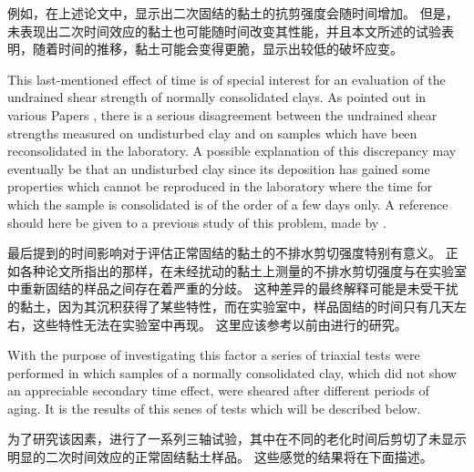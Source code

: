 \begin{paracol}{2}
    \switchcolumn
        
    例如，在上述论文中，显示出二次固结的黏土的抗剪强度会随时间增加。 但是，未表现出二次时间效应的黏土也可能随时间改变其性能，并且本文所述的试验表明，随着时间的推移，黏土可能会变得更脆，显示出较低的破坏应变。

    \switchcolumn*

    This last-mentioned effect of time is of special interest for an evaluation of the undrained shear strength of normally consolidated clays. As pointed out in various Papers \citep{Bjerrum1960711, Bjerrum196123a}, there is a serious disagreement between the undrained shear strengths measured on undisturbed clay and on samples which have been reconsolidated in the laboratory. A possible explanation of this discrepancy may eventually be that an undisturbed clay since its deposition has gained some properties which cannot be reproduced in the laboratory where the time for which the sample is consolidated is of the order of a few days only. A reference should here be given to a previous study of this problem, made by \citet{Taylor195363}.

    \switchcolumn
        
    最后提到的时间影响对于评估正常固结的黏土的不排水剪切强度特别有意义。 正如各种论文所指出的那样\citep{Bjerrum1960711, Bjerrum196123a}，在未经扰动的黏土上测量的不排水剪切强度与在实验室中重新固结的样品之间存在着严重的分歧。 这种差异的最终解释可能是未受干扰的黏土，因为其沉积获得了某些特性，而在实验室中，样品固结的时间只有几天左右，这些特性无法在实验室中再现。 这里应该参考以前由\citet{Taylor195363}进行的研究。

    \switchcolumn*

    With the purpose of investigating this factor a series of triaxial tests were performed in which samples of a normally consolidated clay, which did not show an appreciable secondary time effect, were sheared after different periods of aging. It is the results of this senes of tests which will be described below.

    \switchcolumn

    为了研究该因素，进行了一系列三轴试验，其中在不同的老化时间后剪切了未显示明显的二次时间效应的正常固结黏土样品。 这些感觉的结果将在下面描述。
    
\end{paracol}